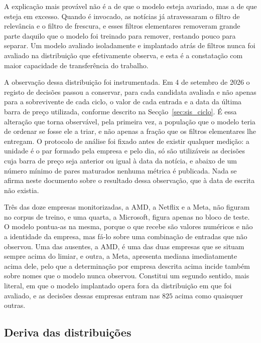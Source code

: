 A explicação mais provável não é a de que o modelo esteja avariado, mas a de que esteja em excesso.
Quando é invocado, as notícias já atravessaram o filtro de relevância e o filtro de frescura, e esses
filtros elementares removeram grande parte daquilo que o modelo foi treinado para remover, restando
pouco para separar. Um modelo avaliado isoladamente e implantado atrás de filtros nunca foi avaliado
na distribuição que efetivamente observa, e esta é a constatação com maior capacidade de
transferência do trabalho.

A observação dessa distribuição foi instrumentada. Em 4 de setembro de 2026 o registo de
decisões passou a conservar, para cada candidata avaliada e não apenas para a
sobrevivente de cada ciclo, o valor de cada entrada e a data da última barra de preço
utilizada, conforme descrito na Secção~\ref{sec:sis_ciclo}. É essa alteração que
torna observável, pela primeira vez, a população que o modelo teria de ordenar se fosse
ele a triar, e não apenas a fração que os filtros elementares lhe entregam. O protocolo
de análise foi fixado antes de existir qualquer medição: a unidade é o par formado pela
empresa e pelo dia, só são utilizáveis as decisões cuja barra de preço seja anterior ou
igual à data da notícia, e abaixo de um número mínimo de pares maturados nenhuma métrica
é publicada. Nada se afirma neste documento sobre o resultado dessa observação, que à
data de escrita não existia.

Três das doze empresas monitorizadas, a AMD, a Netflix e a Meta, não figuram no corpus de treino, e
uma quarta, a Microsoft, figura apenas no bloco de teste. O modelo pontua-as na mesma, porque o que
recebe são valores numéricos e não a identidade da empresa, mas fá-lo sobre uma combinação de
entradas que não observou. Uma das ausentes, a AMD, é uma das duas empresas que se situam sempre
acima do limiar, e outra, a Meta, apresenta mediana imediatamente acima dele, pelo que a
determinação por empresa descrita acima incide também sobre
nomes que o modelo nunca observou. Constitui um segundo sentido, mais literal, em que o modelo
implantado opera fora da distribuição em que foi avaliado, e as decisões dessas empresas entram
nas $825$ acima como quaisquer outras.

\subsection{Deriva das distribuições}

